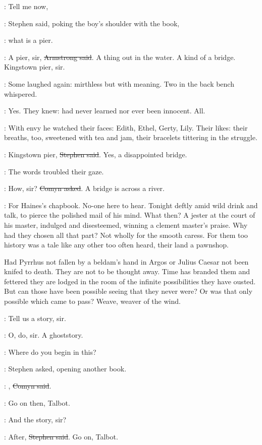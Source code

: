 \Stephen:
Tell me now,

:
Stephen said, poking the boy's shoulder with the book,

\Stephen:
what is a pier.

\armstrong:
A pier, sir, \sout{Armstrong said}.
A thing out in the water.
A kind of a bridge.
Kingstown pier, sir.

:
Some laughed again: mirthless but with meaning.
Two in the back bench whispered.

\StephenInt:
Yes.
They knew: had never learned nor ever been innocent.
All.

:
With envy he watched their faces: Edith, Ethel, Gerty, Lily.
Their likes: their breaths, too,
sweetened with tea and jam,
their bracelets tittering in the struggle.

\Stephen:
Kingstown pier, \sout{Stephen said}.
Yes, a disappointed bridge.

:
The words troubled their gaze.

\comyn:
How, sir?
\sout{Comyn asked}.
A bridge is across a river.

\StephenInt:
For Haines's chapbook.
No-one here to hear.
Tonight deftly amid wild drink and talk,
to pierce the polished mail of his mind.
What then?
A jester at the court of his master, 
indulged and disesteemed,
winning a clement master's praise.
Why had they chosen all that part?
Not wholly for the smooth caress.
For them too history was a tale like any other too often heard,
their land a pawnshop.

Had Pyrrhus not fallen by a beldam's hand in Argos
or Julius Caesar not been knifed to death.
They are not to be thought away.
Time has branded them
and fettered they are lodged in the room of the infinite possibilities
they have ousted.
But can those have been possible
seeing that they never were?
Or was that only possible which came to pass?
Weave, weaver of the wind.

\All:
Tell us a story, sir.

\All:
O, do, sir. A ghoststory.

\Stephen:
Where do you begin in this?

:
Stephen asked, opening another book.

\comyn:
, \sout{Comyn said}.

\Stephen:
Go on then, Talbot.

\talbot:
And the story, sir?

\Stephen:
After, \sout{Stephen said}.
Go on, Talbot.

